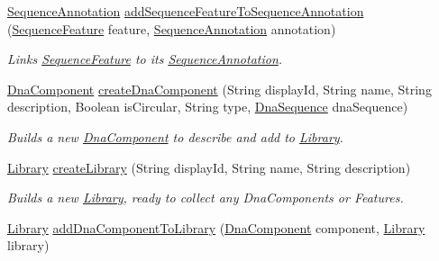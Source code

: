 \begin{DoxyCompactItemize}
\hyperlink{classorg_1_1sbolstandard_1_1lib_s_b_o_lj_1_1_sequence_annotation}{SequenceAnnotation} \hyperlink{classorg_1_1sbolstandard_1_1lib_s_b_o_lj_1_1_sbol_service_a4dbd0885b3977f121439873805a294ba}{addSequenceFeatureToSequenceAnnotation} (\hyperlink{classorg_1_1sbolstandard_1_1lib_s_b_o_lj_1_1_sequence_feature}{SequenceFeature} feature, \hyperlink{classorg_1_1sbolstandard_1_1lib_s_b_o_lj_1_1_sequence_annotation}{SequenceAnnotation} annotation)
\begin{DoxyCompactList}\small\item\em Links \hyperlink{classorg_1_1sbolstandard_1_1lib_s_b_o_lj_1_1_sequence_feature}{SequenceFeature} to its \hyperlink{classorg_1_1sbolstandard_1_1lib_s_b_o_lj_1_1_sequence_annotation}{SequenceAnnotation}. \item\end{DoxyCompactList}\item 
\hyperlink{classorg_1_1sbolstandard_1_1lib_s_b_o_lj_1_1_dna_component}{DnaComponent} \hyperlink{classorg_1_1sbolstandard_1_1lib_s_b_o_lj_1_1_sbol_service_ad3946d924f4c43fa442841aa5d56d474}{createDnaComponent} (String displayId, String name, String description, Boolean isCircular, String type, \hyperlink{classorg_1_1sbolstandard_1_1lib_s_b_o_lj_1_1_dna_sequence}{DnaSequence} dnaSequence)
\begin{DoxyCompactList}\small\item\em Builds a new \hyperlink{classorg_1_1sbolstandard_1_1lib_s_b_o_lj_1_1_dna_component}{DnaComponent} to describe and add to \hyperlink{classorg_1_1sbolstandard_1_1lib_s_b_o_lj_1_1_library}{Library}. \item\end{DoxyCompactList}\item 
\hyperlink{classorg_1_1sbolstandard_1_1lib_s_b_o_lj_1_1_library}{Library} \hyperlink{classorg_1_1sbolstandard_1_1lib_s_b_o_lj_1_1_sbol_service_a7a21049be3161d93bd273e6906899c5a}{createLibrary} (String displayId, String name, String description)
\begin{DoxyCompactList}\small\item\em Builds a new \hyperlink{classorg_1_1sbolstandard_1_1lib_s_b_o_lj_1_1_library}{Library}, ready to collect any DnaComponents or Features. \item\end{DoxyCompactList}\item 
\hyperlink{classorg_1_1sbolstandard_1_1lib_s_b_o_lj_1_1_library}{Library} \hyperlink{classorg_1_1sbolstandard_1_1lib_s_b_o_lj_1_1_sbol_service_a0f8d861cd85028c6a67c6480dc87d15e}{addDnaComponentToLibrary} (\hyperlink{classorg_1_1sbolstandard_1_1lib_s_b_o_lj_1_1_dna_component}{DnaComponent} component, \hyperlink{classorg_1_1sbolstandard_1_1lib_s_b_o_lj_1_1_library}{Library} library)

\end{DoxyCompactItemize}
